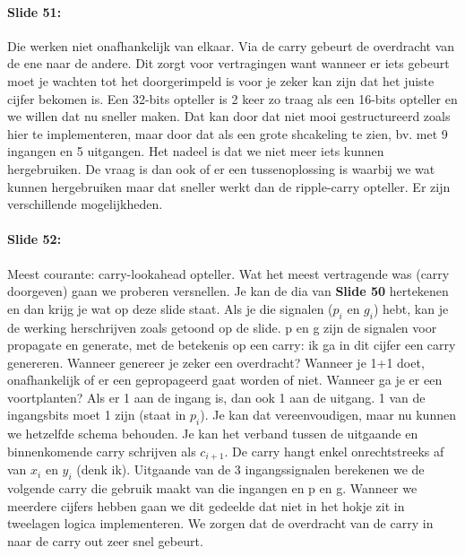 \documentclass[10pt,a4paper]{book}
\begin{document}
\paragraph{Slide 51:} Die werken niet onafhankelijk van elkaar. Via de carry gebeurt de overdracht van de ene naar de andere. Dit zorgt voor vertragingen want wanneer er iets gebeurt moet je wachten tot het doorgerimpeld is voor je zeker kan zijn dat het juiste cijfer bekomen is. Een 32-bits opteller is 2 keer zo traag als een 16-bits opteller en we willen dat nu sneller maken. Dat kan door dat niet mooi gestructureerd zoals hier te implementeren, maar door dat als een grote shcakeling te zien, bv. met 9 ingangen en 5 uitgangen. Het nadeel is dat we niet meer iets kunnen hergebruiken. De vraag is dan ook of er een tussenoplossing is waarbij we wat kunnen hergebruiken maar dat sneller werkt dan de ripple-carry opteller. Er zijn verschillende mogelijkheden.

\paragraph{Slide 52:} Meest courante: carry-lookahead opteller. Wat het meest vertragende was (carry doorgeven) gaan we proberen versnellen. Je kan de dia van \textbf{Slide 50} hertekenen en dan krijg je wat op deze slide staat. Als je die signalen ($p_i$ en $g_i$) hebt, kan je de werking herschrijven zoals getoond op de slide. p en g zijn de signalen voor propagate en generate, met de betekenis op een carry: ik ga in dit cijfer een carry genereren. Wanneer genereer je zeker een overdracht? Wanneer je 1+1 doet, onafhankelijk of er een gepropageerd gaat worden of niet. Wanneer ga je er een voortplanten? Als er 1 aan de ingang is, dan ook 1 aan de uitgang. 1 van de ingangsbits moet 1 zijn (staat in $p_i$). Je kan dat vereenvoudigen, maar nu kunnen we hetzelfde schema behouden. Je kan het verband tussen de uitgaande en binnenkomende carry schrijven als $c_{i+1}$. De carry hangt enkel onrechtstreeks af van $x_i$ en $y_i$ (denk ik). Uitgaande van de 3 ingangssignalen berekenen we de volgende carry die gebruik maakt van die ingangen en p en g. Wanneer we meerdere cijfers hebben gaan we dit gedeelde dat niet in het hokje zit in tweelagen logica implementeren. We zorgen dat de overdracht van de carry in naar de carry out zeer snel gebeurt.
\end{document}
